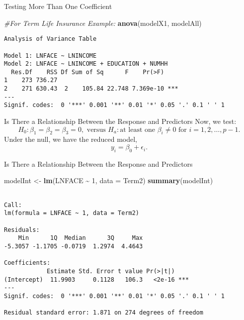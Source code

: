\documentclass[
  ignorenonframetext,
]{beamer}
\newenvironment{Shaded}{\begin{snugshade}}{\end{snugshade}}
\newcommand{\AttributeTok}[1]{\textcolor[rgb]{0.13,0.29,0.53}{#1}}
\newcommand{\CommentTok}[1]{\textcolor[rgb]{0.56,0.35,0.01}{\textit{#1}}}
\newcommand{\DecValTok}[1]{\textcolor[rgb]{0.00,0.00,0.81}{#1}}
\newcommand{\FunctionTok}[1]{\textcolor[rgb]{0.13,0.29,0.53}{\textbf{#1}}}
\newcommand{\NormalTok}[1]{#1}
\newcommand{\OtherTok}[1]{\textcolor[rgb]{0.56,0.35,0.01}{#1}}
\newcommand{\SpecialCharTok}[1]{\textcolor[rgb]{0.81,0.36,0.00}{\textbf{#1}}}
\begin{document}
\begin{frame}[fragile]{Testing More Than One Coefficient}
\protect\hypertarget{testing-more-than-one-coefficient-1}{}
\normalsize

\begin{Shaded}
\begin{Highlighting}[]
\CommentTok{\#For Term Life Insurance Example:}
\FunctionTok{anova}\NormalTok{(modelX1, modelAll)}
\end{Highlighting}
\end{Shaded}

\begin{verbatim}
Analysis of Variance Table

Model 1: LNFACE ~ LNINCOME
Model 2: LNFACE ~ LNINCOME + EDUCATION + NUMHH
  Res.Df    RSS Df Sum of Sq      F    Pr(>F)    
1    273 736.27                                  
2    271 630.43  2    105.84 22.748 7.369e-10 ***
---
Signif. codes:  0 '***' 0.001 '**' 0.01 '*' 0.05 '.' 0.1 ' ' 1
\end{verbatim}

\normalsize
\end{frame}

\begin{frame}{Is There a Relationship Between the Response and
Predictors}
\protect\hypertarget{is-there-a-relationship-between-the-response-and-predictors}{}
Now, we test:
\[H_0:\beta_1=\beta_2=\beta_3=0, \text{ versus } H_a: \text{at least one } \beta_i \neq 0 \text{ for } i = 1, 2, \ldots, p-1.\]
Under the null, we have the reduced model, \[y_i=\beta_0+\epsilon_i.\]
\end{frame}

\begin{frame}[fragile]{Is There a Relationship Between the Response and
Predictors}
\protect\hypertarget{is-there-a-relationship-between-the-response-and-predictors-1}{}
\normalsize

\begin{Shaded}
\begin{Highlighting}[]
\NormalTok{modelInt }\OtherTok{\textless{}{-}} \FunctionTok{lm}\NormalTok{(LNFACE }\SpecialCharTok{\textasciitilde{}} \DecValTok{1}\NormalTok{, }\AttributeTok{data =}\NormalTok{ Term2)}
\FunctionTok{summary}\NormalTok{(modelInt)}
\end{Highlighting}
\end{Shaded}

\begin{verbatim}

Call:
lm(formula = LNFACE ~ 1, data = Term2)

Residuals:
    Min      1Q  Median      3Q     Max 
-5.3057 -1.1705 -0.0719  1.2974  4.4643 

Coefficients:
            Estimate Std. Error t value Pr(>|t|)    
(Intercept)  11.9903     0.1128   106.3   <2e-16 ***
---
Signif. codes:  0 '***' 0.001 '**' 0.01 '*' 0.05 '.' 0.1 ' ' 1

Residual standard error: 1.871 on 274 degrees of freedom
\end{verbatim}

\normalsize
\end{frame}
\end{document}
